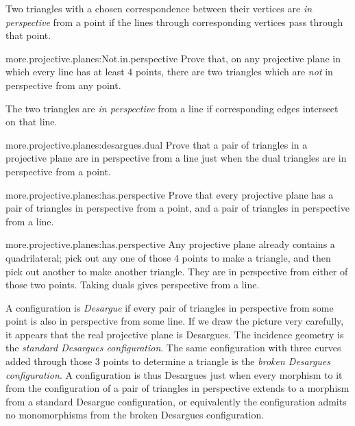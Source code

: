 Two triangles with a chosen correspondence between their vertices are \emph{in perspective} from a point if the lines through corresponding vertices pass through that point.
\begin{problem}{more.projective.planes:Not.in.perspective}
Prove that, on any projective plane in which every line has at least \(4\) points, there are two triangles which are \emph{not} in perspective from any point.
\end{problem}
The two triangles are \emph{in perspective} from a line if corresponding edges intersect on that line.
\begin{problem}{more.projective.planes:desargues.dual}
Prove that a pair of triangles in a projective plane are in perspective from a line just when the dual triangles are in perspective from a point.
\end{problem}
\begin{problem}{more.projective.planes:has.perspective}
Prove that every projective plane has a pair of triangles in perspective from a point, and a pair of triangles in perspective from a line.
\end{problem}
\begin{answer}{more.projective.planes:has.perspective}
Any projective plane already contains a quadrilateral; pick out any one of those 4 points to make a triangle, and then pick out another to make another triangle.
They are in perspective from either of those two points.
Taking duals gives perspective from a line.
\end{answer}
A configuration is \emph{Desargue} if every pair of triangles in perspective from some point is also in perspective from some line.
If we draw the picture very carefully, it appears that the real projective plane is Desargues.
The incidence geometry
is the \emph{standard Desargues configuration}.
The same configuration with three curves added through those \(3\) points to determine a triangle is the \emph{broken Desargues configuration}.
A configuration is thus Desargues just when every morphism to it from the configuration of a pair of triangles in perspective extends to a morphism from a standard Desargue configuration, or equivalently the configuration admits no monomorphisms from the broken Desargues configuration.
